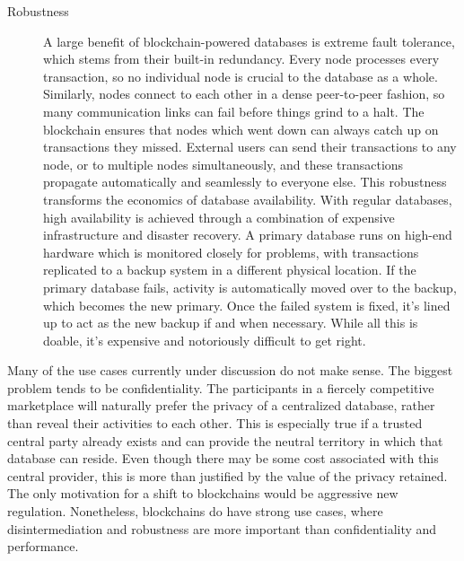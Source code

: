 \begin{description}
     \item[Robustness]
    A large benefit of blockchain-powered databases is extreme fault tolerance, which stems from their built-in redundancy. Every node processes every transaction, so no individual node is crucial to the database as a whole. Similarly, nodes connect to each other in a dense peer-to-peer fashion, so many communication links can fail before things grind to a halt. The blockchain ensures that nodes which went down can always catch up on transactions they missed. External users can send their transactions to any node, or to multiple nodes simultaneously, and these transactions propagate automatically and seamlessly to everyone else.
    This robustness transforms the economics of database availability. With regular databases, high availability is achieved through a combination of expensive infrastructure and disaster recovery. A primary database runs on high-end hardware which is monitored closely for problems, with transactions replicated to a backup system in a different physical location. If the primary database fails, activity is automatically moved over to the backup, which becomes the new primary. Once the failed system is fixed, it’s lined up to act as the new backup if and when necessary. While all this is doable, it’s expensive and notoriously difficult to get right.

\end{description}

Many of the use cases currently under discussion do not make sense. The biggest problem tends to be confidentiality. The participants in a fiercely competitive marketplace will naturally prefer the privacy of a centralized database, rather than reveal their activities to each other. This is especially true if a trusted central party already exists and can provide the neutral territory in which that database can reside. Even though there may be some cost associated with this central provider, this is more than justified by the value of the privacy retained. The only motivation for a shift to blockchains would be aggressive new regulation. Nonetheless, blockchains do have strong use cases, where disintermediation and robustness are more important than confidentiality and performance. \cite{steemit2}
 